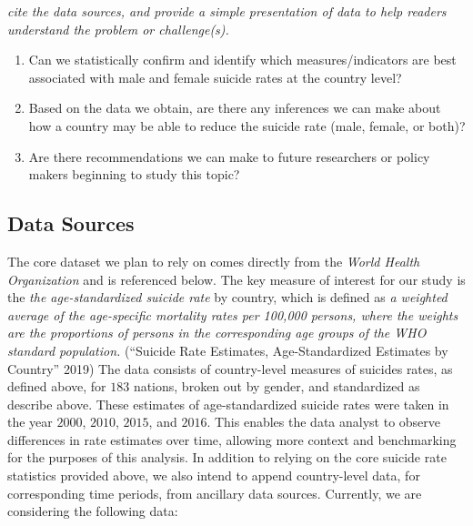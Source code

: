 \documentclass[]{article}
\begin{document}
\emph{cite the data sources, and provide a simple presentation of data
to help readers understand the problem or challenge(s).}

\begin{enumerate}
\def\labelenumi{\arabic{enumi}.}
\item
  Can we statistically confirm and identify which measures/indicators
  are best associated with male and female suicide rates at the country
  level?
\item
  Based on the data we obtain, are there any inferences we can make
  about how a country may be able to reduce the suicide rate (male,
  female, or both)?
\item
  Are there recommendations we can make to future researchers or policy
  makers beginning to study this topic?
\end{enumerate}

\subsection{Data Sources}\label{data-sources}

The core dataset we plan to rely on comes directly from the \emph{World
Health Organization} and is referenced below. The key measure of
interest for our study is the \emph{the age-standardized suicide rate}
by country, which is defined as \emph{a weighted average of the
age-specific mortality rates per 100,000 persons, where the weights are
the proportions of persons in the corresponding age groups of the WHO
standard population.} (``Suicide Rate Estimates, Age-Standardized
Estimates by Country'' 2019) The data consists of country-level measures
of suicides rates, as defined above, for \(183\) nations, broken out by
gender, and standardized as describe above. These estimates of
age-standardized suicide rates were taken in the year \(2000\),
\(2010\), \(2015\), and \(2016\). This enables the data analyst to
observe differences in rate estimates over time, allowing more context
and benchmarking for the purposes of this analysis. In addition to
relying on the core suicide rate statistics provided above, we also
intend to append country-level data, for corresponding time periods,
from ancillary data sources. Currently, we are considering the following
data:
\end{document}
